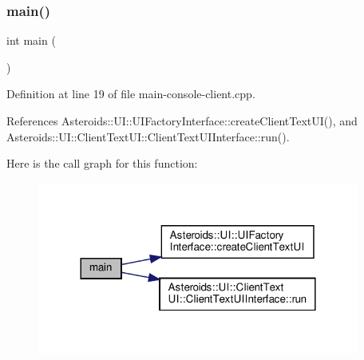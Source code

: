 \subsubsection{\texorpdfstring{main()}{main()}}
{\footnotesize\ttfamily int main (\begin{DoxyParamCaption}{ }\end{DoxyParamCaption})}



Definition at line 19 of file main-\/console-\/client.\+cpp.



References Asteroids\+::\+U\+I\+::\+U\+I\+Factory\+Interface\+::create\+Client\+Text\+U\+I(), and Asteroids\+::\+U\+I\+::\+Client\+Text\+U\+I\+::\+Client\+Text\+U\+I\+Interface\+::run().

Here is the call graph for this function\+:\nopagebreak
\begin{figure}[H]
\begin{center}
\leavevmode
\includegraphics[width=300pt]{main-console-client_8cpp_ae66f6b31b5ad750f1fe042a706a4e3d4_cgraph}
\end{center}
\end{figure}
